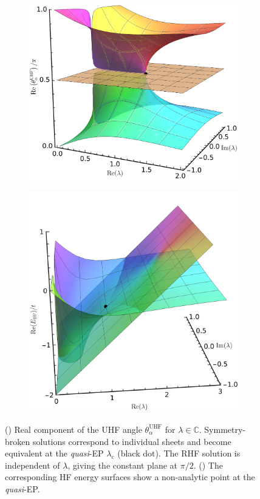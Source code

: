 \documentclass[aps,prb,reprint,noshowkeys,linenumbers,superscriptaddress]{revtex4-1}
\newcommand{\ta}{\theta_{\alpha}}
\newcommand{\bbC}{\mathbb{C}}
\begin{document}
\begin{figure}[t]
	\begin{subfigure}{0.49\textwidth}
    \includegraphics[height=0.65\textwidth,trim={0pt 0pt 0pt -35pt},clip]{HF_cplx_angle}
	\subcaption{\label{subfig:UHF_cplx_angle}}
    \end{subfigure}
	\begin{subfigure}{0.49\textwidth}
	\includegraphics[height=0.65\textwidth]{HF_cplx_energy}
	\subcaption{\label{subfig:UHF_cplx_energy}}
    \end{subfigure}
	\caption{%
    () Real component of the UHF angle $\ta^{\text{UHF}}$ for $\lambda \in \bbC$.
    Symmetry-broken solutions correspond to individual sheets and become equivalent at 
    the \textit{quasi}-EP $\lambda_{\text{c}}$ (black dot).
    The RHF solution is independent of $\lambda$, giving the constant plane at $\pi/2$.
    () The corresponding HF energy surfaces show a non-analytic 
    point at the \textit{quasi}-EP.
	\label{fig:HF_cplx}}
\end{figure}
\end{document}
